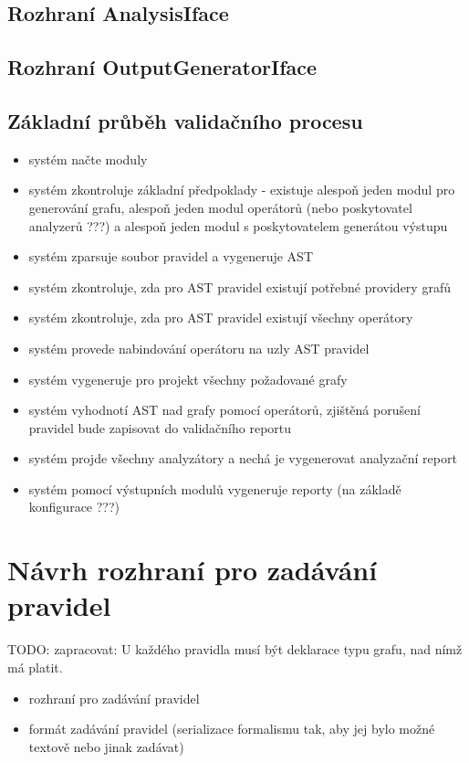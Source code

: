 \subsection{Rozhraní AnalysisIface}
\subsection{Rozhraní OutputGeneratorIface}

\subsection{Základní průběh validačního procesu}
\begin{itemize}
\item systém načte moduly
\item systém zkontroluje základní předpoklady - existuje alespoň jeden modul pro generování grafu, alespoň jeden modul operátorů (nebo poskytovatel analyzerů ???) a alespoň jeden modul s poskytovatelem generátou výstupu
\item systém zparsuje soubor pravidel a vygeneruje AST
\item systém zkontroluje, zda pro AST pravidel existují potřebné providery grafů
\item systém zkontroluje, zda pro AST pravidel existují všechny operátory
\item systém provede nabindování operátoru na uzly AST pravidel
\item systém vygeneruje pro projekt všechny požadované grafy
\item systém vyhodnotí AST nad grafy pomocí operátorů, zjištěná porušení pravidel bude zapisovat do validačního reportu
\item systém projde všechny analyzátory a nechá je vygenerovat analyzační report
\item systém pomocí výstupních modulů vygeneruje reporty (na základě konfigurace ???)
\end{itemize}

\section{Návrh rozhraní pro zadávání pravidel}
TODO: zapracovat: U každého pravidla musí být deklarace typu grafu, nad nímž má platit.
\begin{itemize}
\item rozhraní pro zadávání pravidel
\item formát zadávání pravidel (serializace formalismu tak, aby jej bylo možné textově nebo jinak zadávat)
\end{itemize}


